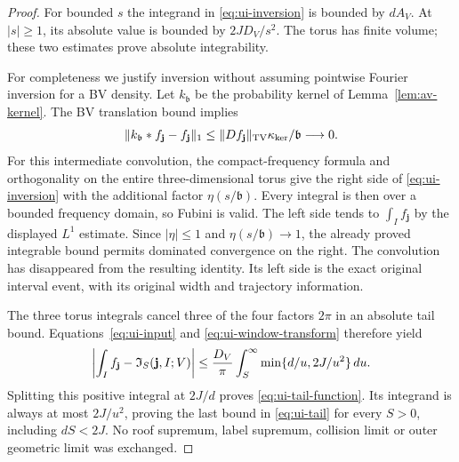 \begin{proof}
For bounded $s$ the integrand in \eqref{eq:ui-inversion} is bounded by
$dA_V$.  At $|s|\ge1$, its absolute value is bounded by
$2JD_V/s^2$.  The torus has finite volume; these two estimates prove
absolute integrability.

For completeness we justify inversion without assuming pointwise
Fourier inversion for a BV density.  Let $k_{\mathfrak b}$ be the
probability kernel of Lemma~\ref{lem:av-kernel}.  The BV translation
bound implies
\[
 \|k_{\mathfrak b}*f_{\mathbf j}-f_{\mathbf j}\|_1
   \le\|Df_{\mathbf j}\|_{\rm TV}
                  \kappa_{\rm ker}/\mathfrak b\longrightarrow0.
\]
For this intermediate convolution, the compact-frequency formula and
orthogonality on the entire three-dimensional torus give the right
side of \eqref{eq:ui-inversion} with the additional factor
$\eta(s/\mathfrak b)$.  Every integral is then over a bounded
frequency domain, so Fubini is valid.  The left side tends to
$\int_I f_{\mathbf j}$ by the displayed $L^1$ estimate.
Since $|\eta|\le1$ and $\eta(s/\mathfrak b)\to1$, the already
proved integrable bound permits dominated convergence on the right.
The convolution has disappeared from the resulting identity.  Its
left side is the exact original interval event, with its original
width and trajectory information.

The three torus integrals cancel three of the four factors $2\pi$
in an absolute tail bound.  Equations~\eqref{eq:ui-input} and
\eqref{eq:ui-window-transform} therefore yield
\[
 \left|\int_I f_{\mathbf j}-\mathfrak I_S(\mathbf j,I;V)\right|
 \le {D_V\over\pi}\int_S^\infty
                       \min\{d/u,2J/u^2\}\,du.
\]
Splitting this positive integral at $2J/d$ proves
\eqref{eq:ui-tail-function}.  Its integrand is always at most
$2J/u^2$, proving the last bound in \eqref{eq:ui-tail} for every
$S>0$, including $dS<2J$.  No roof supremum, label supremum,
collision limit or outer geometric limit was exchanged.
\end{proof}

